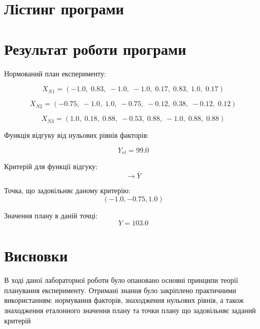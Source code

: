 \section{Лістинг програми}



\section{Результат роботи програми}

Нормований план експерименту:

\[ X_{N1} = \left(-1.0,\; 0.83,\; -1.0,\; -1.0,\; 0.17,\; 0.83,\; 1.0,\; 0.17\right)\]

\[ X_{N2} = \left(-0.75,\; -1.0,\; 1.0,\; -0.75,\; -0.12,\; 0.38,\; -0.12,\; 0.12\right)\]

\[ X_{N3} = \left(1.0,\; 0.18,\; 0.88,\; -0.53,\; 0.88,\; -1.0,\; 0.88,\; 0.88\right)\]

Функція відгуку від нульових рівнів факторів:

\[Y_{et} = 99.0\]

Критерій для функції відгуку:
\[\rightarrow \bar{Y}\]

Точка, що задовільняє даному критерію:
\[\left(-1.0, -0.75, 1.0\right)\]

Значення плану в даній точці:
\[Y = 103.0\]

\section{Висновки}
В ході даної лабораторної роботи було опановано основні принципи теорії планування експерименту. 
Отримані знання було закріплено практичними використанням: нормування факторів, знаходження нульових рівнів, 
а також знаходження еталонного значення плану та точки плану що задовільняє заданий критерій
